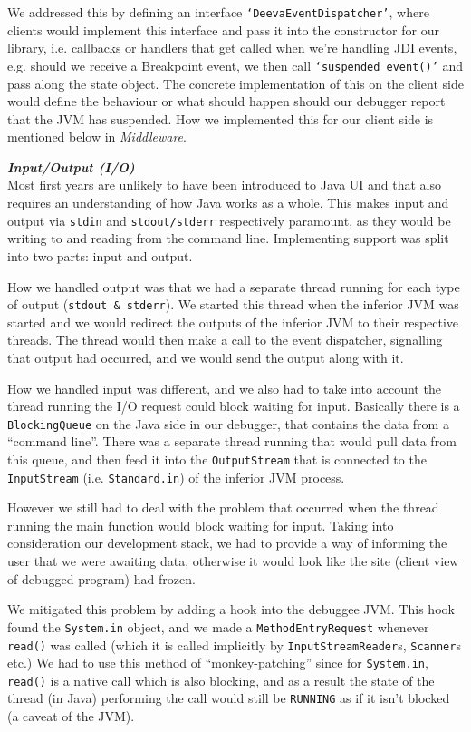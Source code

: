 \documentclass[11pt, a4paper]{article}
\begin{document}
We addressed this by defining an interface \texttt{`DeevaEventDispatcher'}, where clients would implement this interface and pass it into the constructor for our library, i.e. callbacks or handlers that get called when we're handling JDI events, e.g. should we receive a Breakpoint event, we then call \texttt{`suspended\_event()'} and pass along the state object.
The concrete implementation of this on the client side would define the behaviour or what should happen should our debugger report that the JVM has suspended.
How we implemented this for our client side is mentioned below in \emph{Middleware}.

\textbf{\emph{Input/Output (I/O)}}\\
Most first years are unlikely to have been introduced to Java UI and that also requires an understanding of how Java works as a whole.
This makes input and output via \texttt{stdin} and \texttt{stdout/stderr} respectively paramount, as they would be writing to and reading from the command line.
Implementing support was split into two parts: input and output.

How we handled output was that we had a separate thread running for each type of output (\texttt{stdout \& stderr}). We started this thread when the inferior JVM was started and we would redirect the outputs of the inferior JVM to their respective threads.
The thread would then make a call to the event dispatcher, signalling that output had occurred, and we would send the output along with it.

How we handled input was different, and we also had to take into account the thread running the I/O request could block waiting for input.
Basically there is a \texttt{BlockingQueue} on the Java side in our debugger, that contains the data from a ``command line''.
There was a separate thread running that would pull data from this queue, and then feed it into the \texttt{OutputStream} that is connected to the \texttt{InputStream} (i.e. \texttt{Standard.in}) of the inferior JVM process.

However we still had to deal with the problem that occurred when the thread running the main function would block waiting for input.
Taking into consideration our development stack, we had to provide a way of informing the user that we were awaiting data, otherwise it would look like the site (client view of debugged program) had frozen.

We mitigated this problem by adding a hook into the debuggee JVM.
This hook found the \texttt{System.in} object, and we made a \texttt{MethodEntryRequest} whenever \texttt{read()} was called (which it is called implicitly by \texttt{InputStreamReader}s, \texttt{Scanner}s etc.)
We had to use this method of ``monkey-patching'' since for \texttt{System.in}, \texttt{read()} is a native call which is also blocking, and as a result the state of the thread (in Java) performing the call would still be \texttt{RUNNING} as if it isn't blocked (a caveat of the JVM).
\end{document}
